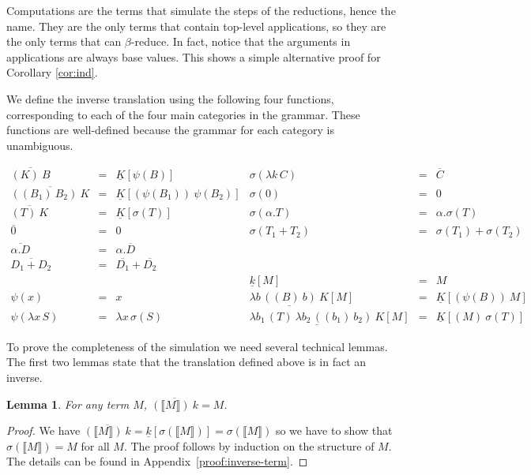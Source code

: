 \documentclass{LMCS}
\newtheorem{lemma}[theorem]{Lemma}
\newcommand{\App}[1]{The details can be found in Appendix~\ref{proof:#1}}
\newcommand{\wt}[1]{\llbracket{#1}\rrbracket}
\begin{document}
Computations are the terms that simulate the steps of the reductions,
hence the name. They are the only terms that contain top-level applications,
so they are the only terms that can $\beta$-reduce. In fact, notice
that the arguments in applications are always base values. This shows
a simple alternative proof for Corollary \ref{cor:ind}.

We define the inverse translation using the following four functions,
corresponding to each of the four main categories in the grammar. These functions are well-defined because the grammar for each category
is unambiguous.

\[
  \begin{array}{rclrcl}
    \overline{(K)~B} & = & \underline{K}[\psi(B)] & \sigma(\lambda k\,C) & = & \overline{C}\\
    \overline{((B_{1})~B_{2})~K} & = & \underline{K}[(\psi(B_{1}))~\psi(B_{2})] & \sigma(0) & = & 0\\
    \overline{(T)~K} & = & \underline{K}[\sigma(T)] & \sigma(\alpha.T) & = & \alpha.\sigma(T)\\
    \overline{0} & = & 0 & \sigma(T_{1}+T_{2}) & = & \sigma(T_{1})+\sigma(T_{2})\\
    \overline{\alpha.D} & = & \alpha.\overline{D}\\
    \overline{D_{1}+D_{2}} & = & \overline{D_{1}}+\overline{D_{2}}\\
    &  &  & \underline{k}[M] & = & M\\
    \psi(x) & = & x & \underline{\lambda b\,((B)~b)~K}[M] & = & \underline{K}[(\psi(B))~M]\\
    \psi(\lambda x\,S) & = & \lambda x\,\sigma(S) & \underline{\lambda{b_{1}}\,(T)~\lambda{b_{2}}\,((b_{1})~b_{2})~K}[M] & = & \underline{K}[(M)~\sigma(T)]
  \end{array}
\]


To prove the completeness of the simulation we need
several technical lemmas.
The first two lemmas state that the translation defined
above is in fact an inverse.

\begin{lemma}
  \label{lem:inverse-term} For any term $M$, $\overline{(\wt M)~k}=M$.
\end{lemma}
\begin{proof}
  We have $\overline{(\wt M)~k}=\underline{k}[\sigma(\wt M)]=\sigma(\wt M)$
  so we have to show that $\sigma(\wt M)=M$ for all $M$. The
  proof follows by induction on the structure of $M$. \App{inverse-term}.
\end{proof}
\end{document}
